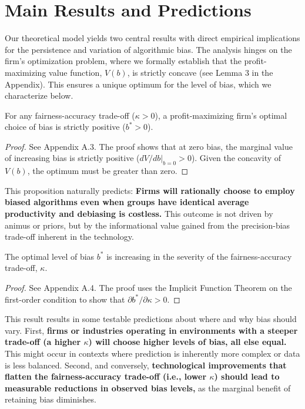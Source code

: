 \section{Main Results and Predictions}

Our theoretical model yields two central results with direct empirical implications for the persistence and variation of algorithmic bias. The analysis hinges on the firm's optimization problem, where we formally establish that the profit-maximizing value function, $V(b)$, is strictly concave (see Lemma 3 in the Appendix). This ensures a unique optimum for the level of bias, which we characterize below.

\begin{proposition}
    \label{prop:existence}
    For any fairness-accuracy trade-off ($\kappa > 0$), a profit-maximizing firm's optimal choice of bias is strictly positive ($b^* > 0$).
    \end{proposition}
    \begin{proof}
    See Appendix A.3. The proof shows that at zero bias, the marginal value of increasing bias is strictly positive ($dV/db|_{b=0} > 0$). Given the concavity of $V(b)$, the optimum must be greater than zero.
    \end{proof}
    
    This proposition naturally predicts: \textbf{Firms will rationally choose to employ biased algorithms even when groups have identical average productivity and debiasing is costless.} This outcome is not driven by animus or priors, but by the informational value gained from the precision-bias trade-off inherent in the technology.


    \begin{proposition}
        \label{prop:comparative_static}
        The optimal level of bias $b^*$ is increasing in the severity of the fairness-accuracy trade-off, $\kappa$.
        \end{proposition}
        \begin{proof}
        See Appendix A.4. The proof uses the Implicit Function Theorem on the first-order condition to show that $\partial b^*/\partial\kappa > 0$.
        \end{proof}
        
        This result results in some testable predictions about where and why bias should vary. 
        First, \textbf{firms or industries operating in environments with a steeper trade-off (a higher $\kappa$) will choose higher levels of bias, all else equal.} This might occur in contexts where prediction is inherently more complex or data is less balanced.
        Second, and conversely, \textbf{technological improvements that flatten the fairness-accuracy trade-off (i.e., lower $\kappa$) should lead to measurable reductions in observed bias levels,} as the marginal benefit of retaining bias diminishes.

